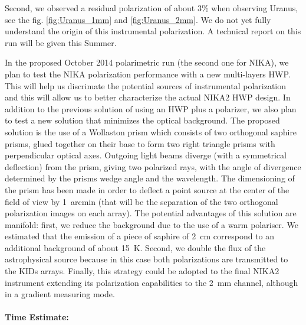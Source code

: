 \documentclass[12pt,a4]{article}
\begin{document}
Second, we observed a residual polarization of about 3\% when observing
Uranus, see the fig. \ref{fig:Uranus_1mm}  and \ref{fig:Uranus_2mm}.
 We do not yet fully understand the origin of this instrumental
polarization. A technical report on this run will be given this Summer.

In the proposed October 2014 polarimetric run (the second one for NIKA), we
plan to test the NIKA polarization performance with a new multi-layers
HWP. This will help us discrimate the potential sources of instrumental
polarization and this will allow us to better characterize the actual NIKA2
HWP design. In addition to the previous solution of using an HWP plus a
polarizer, we also plan to test a new solution that minimizes the optical
background.
The proposed solution is the use of a Wollaston prism which
consists of two orthogonal saphire prisms, glued together on their base to
form two right triangle prisms with perpendicular optical axes. Outgoing light
beams diverge (with a symmetrical deflection) from the prism, giving two
polarized rays, with the angle of divergence determined by the prisms wedge
angle and the wavelength. The dimensioning of the prism has been made in order
to deflect a point source at the center of the field of view by 1~arcmin (that
will be the separation of the two orthogonal polarization images on each
array). The potential advantages of this solution are manifold: first, we
reduce the background due to the use of a warm polariser. We estimated that
the emission of a piece of saphire of 2~cm correspond to an additional
background of about 15~K. Second, we double the flux of the astrophysical
source because in this case both polarizations are transmitted to the KIDs
arrays. Finally, this strategy could be adopted to the final NIKA2 instrument
extending its polarization
capabilities to the 2~mm channel, although in a gradient measuring mode.  \\
\\ {\bfseries Time Estimate:}
\end{document}
